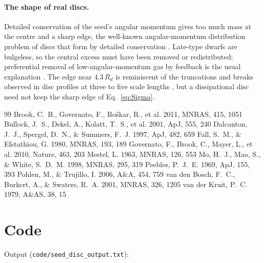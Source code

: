 \documentclass[11pt,a4paper]{article}
\begin{document}
\paragraph{The shape of real discs.} Detailed conservation of the seed's
angular momentum gives too much mass at the centre and a sharp edge,
the well-known angular-momentum distribution problem of discs that form
by detailed conservation \citep{Dalcanton1997,Bullock2001,vandenBosch2001}.
Late-type dwarfs are bulgeless, so the central excess must have been
removed or redistributed; preferential removal of low-angular-momentum
gas by feedback is the usual explanation
\citep{Governato2010,Brook2011}. The edge near $4.3\,R_d$ is reminiscent
of the truncations and breaks observed in disc profiles at three to five
scale lengths \citep{vanderKruit1979,Pohlen2006}, but a dissipational
disc need not keep the sharp edge of Eq.~\eqref{eq:Sigma}.

\begin{thebibliography}{99}
 Brook, C.~B., Governato, F., Ro\v{s}kar, R., et al. 2011, MNRAS, 415, 1051
 Bullock, J.~S., Dekel, A., Kolatt, T.~S., et al. 2001, ApJ, 555, 240
 Dalcanton, J.~J., Spergel, D.~N., \& Summers, F.~J. 1997, ApJ, 482, 659
 Fall, S.~M., \& Efstathiou, G. 1980, MNRAS, 193, 189
 Governato, F., Brook, C., Mayer, L., et al. 2010, Nature, 463, 203
 Mestel, L. 1963, MNRAS, 126, 553
 Mo, H.~J., Mao, S., \& White, S.~D.~M. 1998, MNRAS, 295, 319
 Peebles, P.~J.~E. 1969, ApJ, 155, 393
 Pohlen, M., \& Trujillo, I. 2006, A\&A, 454, 759
 van den Bosch, F.~C., Burkert, A., \& Swaters, R.~A. 2001, MNRAS, 326, 1205
 van der Kruit, P.~C. 1979, A\&AS, 38, 15
\end{thebibliography}

\appendix
\section{Code}\label{app:code}


\noindent Output (\texttt{code/seed\_disc\_output.txt}):

\end{document}
